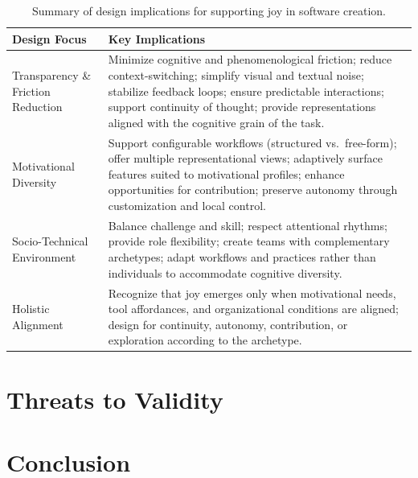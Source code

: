 \documentclass[12pt]{elsarticle}
\begin{document}
\begin{table}[htbp]
\caption{Summary of design implications for supporting joy in 
software creation.}
\label{tab:design}
\centering
\begin{tabularx}{\linewidth}{lX}
\toprule
\textbf{Design Focus} & \textbf{Key Implications} \\
\midrule
Transparency \& Friction Reduction &
    Minimize cognitive and phenomenological friction; reduce 
    context-switching; simplify visual and textual noise; stabilize 
    feedback loops; ensure predictable interactions; support continuity 
    of thought; provide representations aligned with the cognitive grain 
    of the task. \\
\addlinespace
Motivational Diversity &
    Support configurable workflows (structured vs.\ free-form); offer 
    multiple representational views; adaptively surface features suited 
    to motivational profiles; enhance opportunities for contribution; 
    preserve autonomy through customization and local control. \\
\addlinespace
Socio-Technical Environment &
    Balance challenge and skill; respect attentional rhythms; provide 
    role flexibility; create teams with complementary archetypes; adapt 
    workflows and practices rather than individuals to accommodate 
    cognitive diversity. \\
\addlinespace
Holistic Alignment &
    Recognize that joy emerges only when motivational needs, tool 
    affordances, and organizational conditions are aligned; design for 
    continuity, autonomy, contribution, or exploration according to the 
    archetype. \\
\bottomrule
\end{tabularx}
\end{table}


\section{Threats to Validity}
\label{sec:threats}


\section{Conclusion}
\label{sec:conclusion}
\end{document}
